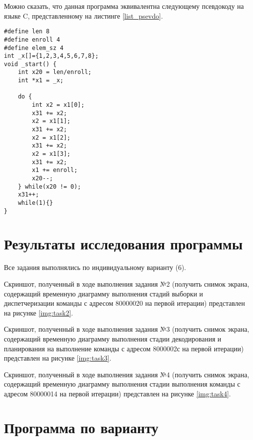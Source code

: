 \clearpage
Можно сказать, что данная программа эквивалентна следующему псевдокоду на языке C, представленному на листинге \ref{list_psevdo}.


\begin{lstlisting}[caption=Псевдокод программы,
	label={list_psevdo}]
#define len 8
#define enroll 4
#define elem_sz 4
int _x[]={1,2,3,4,5,6,7,8};
void _start() {
	int x20 = len/enroll;
	int *x1 = _x;
	
	do {
		int x2 = x1[0];
		x31 += x2;
		x2 = x1[1];
		x31 += x2;
		x2 = x1[2];
		x31 += x2;
		x2 = x1[3];
		x31 += x2;
		x1 += enroll;
		x20--;
	} while(x20 != 0);
	x31++;
	while(1){}
}
\end{lstlisting}


\chapter*{Результаты исследования программы}

Все задания выполнялись по индивидуальному варианту (6).

Скриншот, полученный в ходе выполнения задания №2 (получить снимок экрана, содержащий временную диаграмму выполнения стадий выборки и диспетчеризации команды с адресом 80000020 на первой итерации) представлен на рисунке \ref{img:task2}.


\clearpage
Скриншот, полученный в ходе выполнения задания №3 (получить снимок экрана, содержащий временную диаграмму выполнения стадии декодирования и планирования на выполнение команды с адресом 8000002с на первой итерации) представлен на рисунке \ref{img:task3}.


\clearpage
Скриншот, полученный в ходе выполнения задания №4 (получить снимок экрана, содержащий временную диаграмму выполнения стадии выполнения команды с адресом 80000014 на первой итерации) представлен на рисунке \ref{img:task4}.




\chapter*{Программа по варианту}

